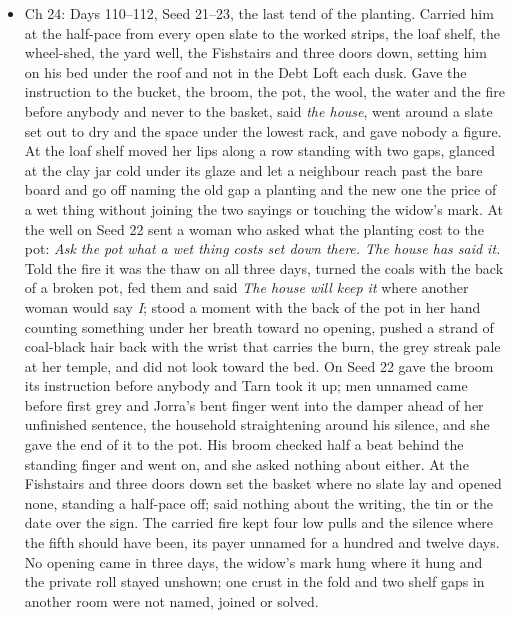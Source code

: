 \documentclass{design/chronicle}
\begin{document}
{\begin{itemize}[leftmargin=1.4em,itemsep=1pt,topsep=3pt,parsep=0pt]
\end{itemize}

\begin{itemize}[leftmargin=1.4em,itemsep=1pt,topsep=3pt,parsep=0pt]

\item Ch 24: Days 110–112, Seed 21–23, the last tend of the planting. Carried him at the half-pace from every open slate to the worked strips, the loaf shelf, the wheel-shed, the yard well, the Fishstairs and three doors down, setting him on his bed under the roof and not in the Debt Loft each dusk. Gave the instruction to the bucket, the broom, the pot, the wool, the water and the fire before anybody and never to the basket, said \emph{the house}, went around a slate set out to dry and the space under the lowest rack, and gave nobody a figure. At the loaf shelf moved her lips along a row standing with two gaps, glanced at the clay jar cold under its glaze and let a neighbour reach past the bare board and go off naming the old gap a planting and the new one the price of a wet thing without joining the two sayings or touching the widow’s mark. At the well on Seed 22 sent a woman who asked what the planting cost to the pot: \emph{Ask the pot what a wet thing costs set down there. The house has said it.} Told the fire it was the thaw on all three days, turned the coals with the back of a broken pot, fed them and said \emph{The house will keep it} where another woman would say \emph{I}; stood a moment with the back of the pot in her hand counting something under her breath toward no opening, pushed a strand of coal-black hair back with the wrist that carries the burn, the grey streak pale at her temple, and did not look toward the bed. On Seed 22 gave the broom its instruction before anybody and Tarn took it up; men unnamed came before first grey and Jorra’s bent finger went into the damper ahead of her unfinished sentence, the household straightening around his silence, and she gave the end of it to the pot. His broom checked half a beat behind the standing finger and went on, and she asked nothing about either. At the Fishstairs and three doors down set the basket where no slate lay and opened none, standing a half-pace off; said nothing about the writing, the tin or the date over the sign. The carried fire kept four low pulls and the silence where the fifth should have been, its payer unnamed for a hundred and twelve days. No opening came in three days, the widow’s mark hung where it hung and the private roll stayed unshown; one crust in the fold and two shelf gaps in another room were not named, joined or solved.


\end{itemize}}
\end{document}
